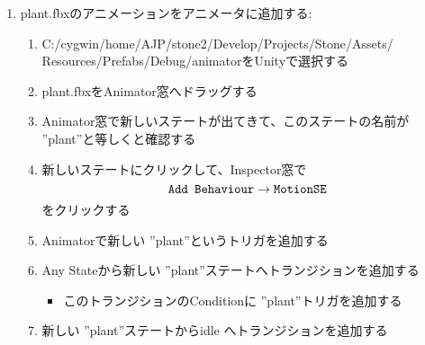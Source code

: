 \documentclass[a4paper]{report}
\newcommand{\fbxname}{{\ttfamily plant.fbx}}
\newcommand{\name}{ {\ttfamily ''plant''}}
\begin{document}
\begin{enumerate}
\begin{enumerate}
\begin{enumerate}
\begin{enumerate}
\begin{itemize}
							\end{itemize}
					\end{enumerate}
			\end{enumerate}
	\end{enumerate}
\item \fbxname のアニメーションをアニメータに追加する:\begin{enumerate}
		\item {\ttfamily C:/cygwin/home/AJP/stone2/Develop/Projects/Stone/Assets/}\\{\ttfamily Resources/Prefabs/Debug/animator}をUnityで選択する
		\item \fbxname をAnimator窓へドラッグする
		\item Animator窓で新しいステートが出てきて、このステートの名前が\name と等しくと確認する
		\item 新しいステートにクリックして、Inspector窓で\begin{equation*}
				\mbox{\ttfamily Add Behaviour}\to\mbox{\ttfamily MotionSE}
			\end{equation*}
			をクリックする
		\item Animatorで新しい\name というトリガを追加する
		\item Any Stateから新しい \name ステートへトランジションを追加する
			\begin{itemize}
				\item このトランジションのConditionに\name トリガを追加する
			\end{itemize}
		\item 新しい \name ステートからidle へトランジションを追加する
	\end{enumerate}
\end{enumerate}
\end{document}
